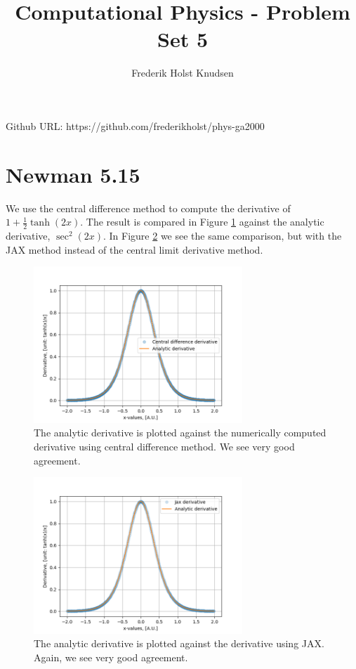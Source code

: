 \documentclass[11pt]{article}
\title{Computational Physics -  Problem Set 5}
\author{Frederik Holst Knudsen}
\begin{document}
\maketitle
Github URL: https://github.com/frederikholst/phys-ga2000
\section{Newman 5.15}

We use the central difference method to compute the derivative of $1+\frac{1}{2}\tanh(2x)$. The result is compared in Figure \ref{cent} against the analytic derivative, $\sec^2(2x)$. In Figure \ref{jax} we see the same comparison, but with the JAX method instead of the central limit derivative method.
\begin{figure}[!htbp]
    \centering
    \includegraphics[width=0.7\textwidth]{problem1.png}
    \caption{The analytic derivative is plotted against the numerically computed derivative using central difference method. We see very good agreement.}
    \label{cent}
\end{figure}
\begin{figure}[!htbp]
    \centering
    \includegraphics[width=0.7\textwidth]{Jax.png}
    \caption{The analytic derivative is plotted against the derivative using JAX. Again, we see very good agreement.}
    \label{jax}
\end{figure}
\end{document}
